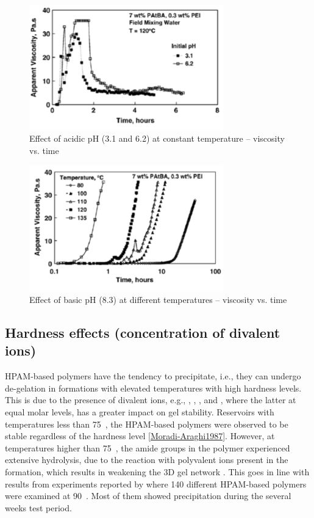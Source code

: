 \begin{figure}
    \centering
    \includegraphics[width=0.75\textwidth]{img/fig/almuntasheriAcidicpH.png}
    \caption{Effect of acidic pH (3.1 and 6.2) at constant temperature – viscosity vs. time \citep{Al-Muntasheri2007}}
    \label{fig:almuntasheriAcidicpH} %
\end{figure}

\begin{figure}
    \centering
    \includegraphics[width=0.75\textwidth]{img/fig/almuntasheriBasicpH.png}
    \caption{Effect of basic pH (8.3) at different temperatures – viscosity vs. time \citep{Al-Muntasheri2007}}
    \label{fig:almuntasheriBasicpH} %
\end{figure}

\subsection{Hardness effects (concentration of divalent ions)}

HPAM-based polymers have the tendency to precipitate, i.e., they can undergo de-gelation in formations with elevated temperatures with high hardness levels. This is due to the presence of divalent ions, e.g., , , , and , where the latter at equal molar levels, has a greater impact on gel stability. Reservoirs with temperatures less than 75~\celsius, the HPAM-based polymers were observed to be stable regardless of the hardness level \ref{Moradi-Araghi1987}. However, at temperatures higher than 75~\celsius, the amide groups in the polymer experienced extensive hydrolysis, due to the reaction with polyvalent ions present in the formation, which results in weakening the 3D gel network \citep{Al-Muntasheri2012, Stahl1989}. This goes in line with results from experiments reported by \citet{Davison1982} where 140 different HPAM-based polymers were examined at 90~\celsius. Most of them showed precipitation during the several weeks test period.


